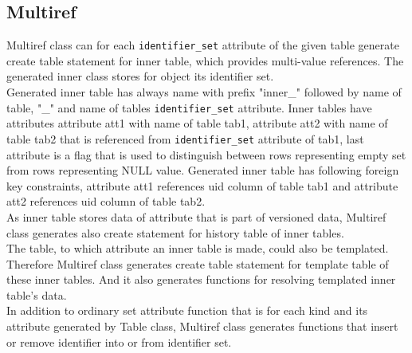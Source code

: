 \documentclass[deska]{subfiles}
\begin{document}
\subsection{Multiref}
Multiref class can for each {\tt identifier\_set} attribute of the given table generate create table statement for inner table, which provides multi-value references. The generated inner class stores for object its identifier set.\\
Generated inner table has always name with prefix "inner\_" followed by name of table, "\_" and name of tables {\tt identifier\_set} attribute. Inner tables have attributes attribute att1 with name of table tab1, attribute att2 with name of table tab2 that is referenced from {\tt identifier\_set} attribute of tab1, last attribute is a flag that is used to distinguish between rows representing empty set from rows representing NULL value. Generated inner table has following foreign key constraints, attribute att1 references uid column of table tab1 and attribute att2 references uid column of table tab2.\\
As inner table stores data of attribute that is part of versioned data, Multiref class generates also create statement for history table of inner tables.\\ 
The table, to which attribute an inner table is made, could also be templated. Therefore Multiref class generates create table statement for template table of these inner tables. And it also generates functions for resolving templated inner table's data.\\
In addition to ordinary set attribute function that is for each kind and its attribute generated by Table class, Multiref class generates functions that insert or remove identifier into or from identifier set.
\end{document}
